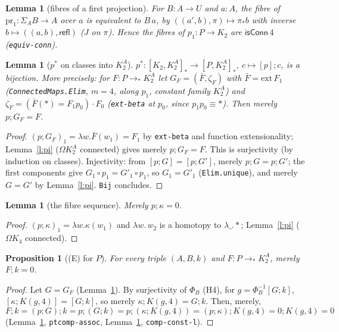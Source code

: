 \documentclass[11pt]{amsart}
\newtheorem{proposition}[theorem]{Proposition}
\newtheorem{lemma}[theorem]{Lemma}
\theoremstyle{definition}
\theoremstyle{remark}
\newcommand{\Om}{\Omega}
\newcommand{\code}[1]{\texttt{#1}}
\newcommand{\cC}{\mathsf{isConn}}
\newcommand{\refl}{\mathsf{refl}}
\newcommand{\hc}[2]{[#1,#2]_*}
\newcommand{\cls}[1]{[#1]}
\begin{document}
\begin{lemma}[fibres of a first projection]\label{l:fibfst}
For $B:A\to U$ and $a:A$, the fibre of $\mathrm{pr}_1:\Sigma_AB\to A$
over $a$ is equivalent to $B\,a$, by $((a',b),\pi)\mapsto\pi_*b$ with
inverse $b\mapsto((a,b),\refl)$ ($J$ on $\pi$). Hence the fibres of
$p_1:P\to K_2$ are $\cC\,4$ (\code{equiv-conn}).
\end{lemma}

\begin{lemma}[$p^*$ on classes into $K^A_2$]\label{l:pstar}
$p^*:\hc{K_2}{K^A_2}\to\hc P{K^A_2}$, $c\mapsto\cls p;c$, is a bijection.
More precisely: for $F:P\to_*K^A_2$ let $G_F=(\bar F,\zeta_F)$ with
$\bar F=\mathrm{ext}\,F_1$ (\code{ConnectedMaps.Elim}, $m=4$, along
$p_1$, constant family $K^A_2$) and
$\zeta_F=(\bar F(*)=F_1p_0)\cdot F_0$ (\code{ext-beta} at $p_0$, since
$p_1p_0\equiv*$). Then merely $p;G_F=F$.
\end{lemma}
\begin{proof}
$(p;G_F)_1=\lambda w.\bar F(w_1)=F_1$ by \code{ext-beta} and function
extensionality; Lemma~\ref{l:pi} ($\Om K^A_2$ connected) gives merely
$p;G_F=F$. This is surjectivity (by induction on classes).
Injectivity: from $\cls{p;G}=\cls{p;G'}$, merely $p;G=p;G'$; the first
components give $G_1\circ p_1=G'_1\circ p_1$, so $G_1=G'_1$
(\code{Elim.unique}), and merely $G=G'$ by Lemma~\ref{l:pi}.
\code{Bij} concludes.
\end{proof}

\begin{lemma}[the fibre sequence]\label{l:fseq}
Merely $p;\kappa=0$.
\end{lemma}
\begin{proof}
$(p;\kappa)_1=\lambda w.\kappa(w_1)$ and $\lambda w.\,w_2$ is a homotopy
to $\lambda\_.*$; Lemma~\ref{l:pi} ($\Om K_4$ connected).
\end{proof}

\begin{proposition}[(E) for $P$]\label{p:EP}
For every triple $(A,B,k)$ and $F:P\to_*K^A_2$, merely $F;k=0$.
\end{proposition}
\begin{proof}
Let $G=G_F$ (Lemma~\ref{l:pstar}). By surjectivity of $\Phi_B$ (H4), for
$g=\Phi_B^{-1}\cls{G;k}$, $\cls{\kappa;K(g,4)}=\cls{G;k}$, so merely
$\kappa;K(g,4)=G;k$. Then, merely,
\[F;k=(p;G);k=p;(G;k)=p;(\kappa;K(g,4))=(p;\kappa);K(g,4)=0;K(g,4)=0\]
(Lemma~\ref{l:pstar}, \code{ptcomp-assoc}, Lemma~\ref{l:fseq},
\code{comp-const-l}).
\end{proof}
\end{document}
